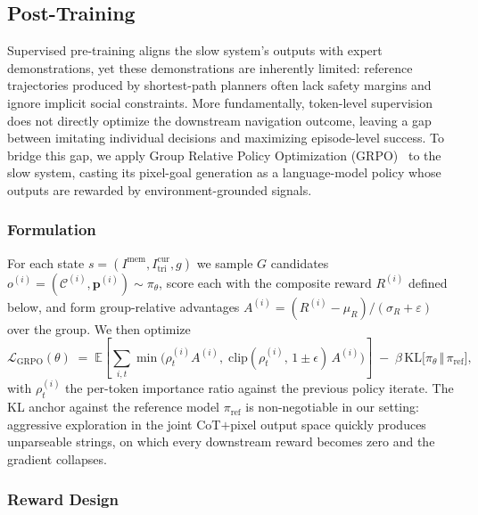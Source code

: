 \subsection{Post-Training}
\label{sec:method-posttraining}

Supervised pre-training aligns the slow system's outputs with expert
demonstrations, yet these demonstrations are inherently limited:
reference trajectories produced by shortest-path planners often lack
safety margins and ignore implicit social constraints. More
fundamentally, token-level supervision does not directly optimize the
downstream navigation outcome, leaving a gap between imitating
individual decisions and maximizing episode-level success. To bridge
this gap, we apply Group Relative Policy Optimization
(GRPO)~\cite{deepseekai2025r1} to the slow system, casting its
pixel-goal generation as a language-model policy whose outputs are
rewarded by environment-grounded signals.

\subsubsection{Formulation}
\label{sec:grpo-formulation}

For each state $s=(I^{\mathrm{mem}}, I^{\mathrm{cur}}_{\mathrm{tri}}, g)$
we sample $G$ candidates $o^{(i)}{=}(\mathcal{C}^{(i)},\mathbf{p}^{(i)})\sim\pi_\theta$, score each with the composite reward $R^{(i)}$ defined
below, and form group-relative advantages
$A^{(i)}{=}(R^{(i)}{-}\mu_R)/(\sigma_R{+}\varepsilon)$ over the group.
We then optimize
\begin{equation}
\mathcal{L}_{\mathrm{GRPO}}(\theta) \;=\;
\mathbb{E}\!\left[\sum_{i,t}
\min\!\bigl(\rho_t^{(i)} A^{(i)},\;
\mathrm{clip}(\rho_t^{(i)},\,1{\pm}\epsilon)\,A^{(i)}\bigr)
\right]
\;-\;\beta\,\mathrm{KL}\!\bigl[\pi_\theta\,\Vert\,\pi_{\mathrm{ref}}\bigr],
\label{eq:grpo}
\end{equation}
with $\rho_t^{(i)}$ the per-token importance ratio against the previous
policy iterate. The KL anchor against the reference model
$\pi_{\mathrm{ref}}$ is non-negotiable in our setting: aggressive
exploration in the joint CoT$+$pixel output space quickly produces
unparseable strings, on which every downstream reward becomes zero
and the gradient collapses.


\subsubsection{Reward Design}
\label{sec:grpo-reward}

